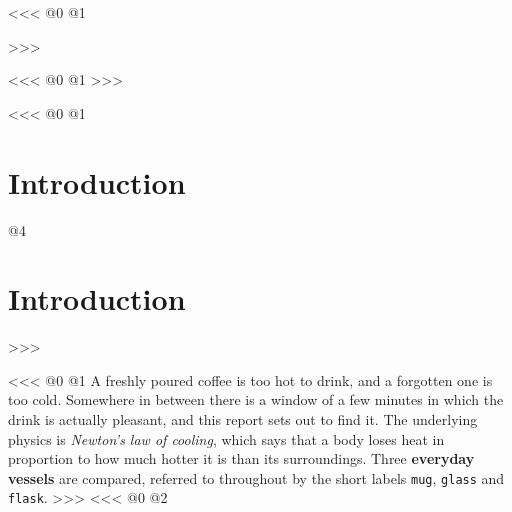 <<<
@0
@1
\maketitle
>>>

<<<
@0
@1
\tableofcontents
>>>

<<<
@0
@1
\section{Introduction}
@4
\section{Introduction}\label{sec:introduction}
>>>

<<<
@0
@1
A freshly poured coffee is too hot to drink, and a forgotten one is too cold.
Somewhere in between there is a window of a few minutes in which the drink is actually pleasant,
and this report sets out to find it.
The underlying physics is \textit{Newton's law of cooling},
which says that a body loses heat in proportion to how much hotter it is than its surroundings.
Three \textbf{everyday vessels} are compared,
referred to throughout by the short labels \texttt{mug}, \texttt{glass} and \texttt{flask}.
>>>
<<<
@0
@2

